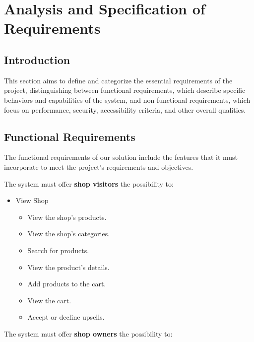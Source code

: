 \chapter{Analysis and Specification of Requirements}

\section{Introduction}
This section aims to define and categorize the essential requirements of the project, distinguishing between functional requirements, which describe specific behaviors and capabilities of the system, and non-functional requirements, which focus on performance, security, accessibility criteria, and other overall qualities.

\section{Functional Requirements}
The functional requirements of our solution include the features that it must incorporate to meet the project's requirements and objectives. 
\newline

The system must offer \textbf{shop visitors} the possibility to:

\begin{itemize}
    \item View Shop
    \begin{itemize}
        \item View the shop's products.
        \item View the shop's categories.
        \item Search for products.
        \item View the product's details.
        \item Add products to the cart.
        \item View the cart.
        \item Accept or decline upsells.
    \end{itemize}
\end{itemize}

The system must offer \textbf{shop owners} the possibility to:

